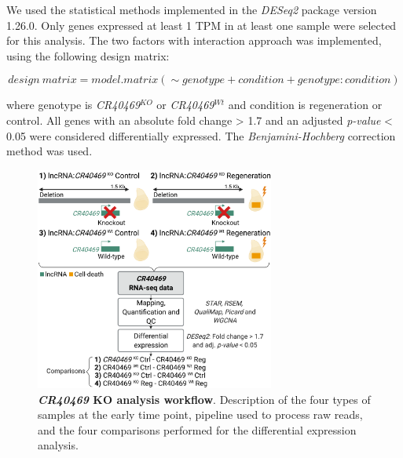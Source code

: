 We used the statistical methods implemented in the \textit{DESeq2}\autocite{love_2014_deseq2} package version 1.26.0. Only genes expressed at least 1 TPM in at least one sample were selected for this analysis. The two factors with interaction approach was implemented, using the following design matrix:  

\[ design\ matrix= model.matrix(\sim genotype + condition + genotype:condition)  \]

where genotype is \textit{CR40469}$^{KO}$ or \textit{CR40469}$^{Wt}$ and condition is regeneration or control. All genes with an absolute fold change > 1.7 and an adjusted \textit{p-value} < 0.05 were considered differentially expressed. The \textit{Benjamini-Hochberg} correction method was used. 

\begin{figure}[!htb]
  \centering
  \includegraphics[width=0.7\textwidth]{img/methods/regeneration/CR40469-KO-methods.png}
  \caption[\textit{CR40469} KO analysis workflow]{\textbf{\textit{CR40469} KO analysis workflow}. Description of the four types of samples at the early time point, pipeline used to process raw reads, and the four comparisons performed for the differential expression analysis.}
  \label{fig:cr40469-workflow}
\end{figure}

